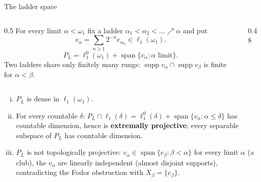 \documentclass[10pt,aspectratio=169]{beamer}
\newcommand{\lo}[1]{\ell_1^0(#1)}
\newcommand{\ellone}[1]{\ell_1(#1)}
\newcommand{\supp}{\operatorname{supp}}
\newcommand{\Lin}{\operatorname{span}}
\begin{document}
\begin{frame}{The ladder space}
  \begin{columns}[c,onlytextwidth]
    \begin{column}{0.5\textwidth}
      For every limit $\alpha<\omega_1$ fix a ladder
      $\alpha_1<\alpha_2<\dots\nearrow\alpha$ and put
      \[
        v_\alpha=\sum_{n\ge1}2^{-n}e_{\alpha_n}\in\ellone{\omega_1}.
      \]
      \[
        P_L=\lo{\omega_1}+\Lin\{v_\alpha:\alpha\text{ limit}\}.
      \]
      Two ladders share only finitely many rungs:
      $\supp v_\alpha\cap\supp v_\beta$ is finite for $\alpha<\beta$.
    \end{column}
    \begin{column}{0.48\textwidth}
      \centering
    \end{column}
  \end{columns}
  \medskip
  \begin{enumerate}[(i)]
    \item $P_L$ is dense in $\ellone{\omega_1}$.
    \item For every countable $\delta$:
      $P_L\cap\ellone\delta=\lo\delta+\Lin\{v_\alpha:\alpha\le\delta\}$ has countable
      dimension, hence is \textbf{extremally projective}; every separable
      subspace of $P_L$ has countable dimension.
    \item $P_L$ is \alert{not topologically projective}: $v_\alpha\in\overline{\Lin}\{e_\beta:\beta<\alpha\}$
      for every limit $\alpha$ (a club), the $v_\alpha$ are linearly
      independent (almost disjoint supports), contradicting the Fodor
      obstruction with $X_\beta=\{e_\beta\}$.
  \end{enumerate}
\end{frame}
\end{document}
